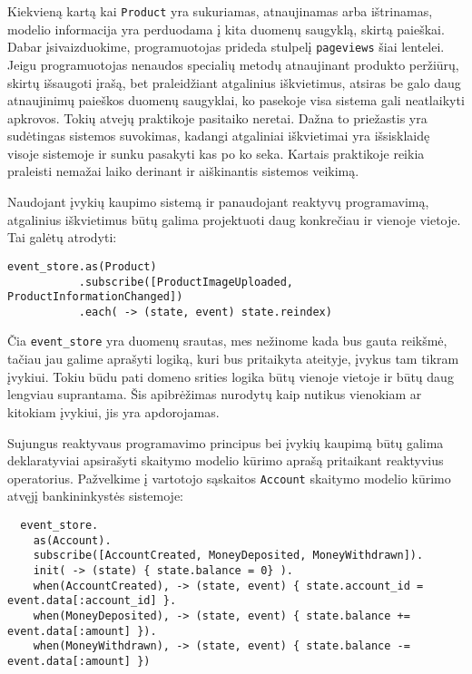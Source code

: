 Kiekvieną kartą kai \lstinline|Product| yra sukuriamas, atnaujinamas arba ištrinamas, modelio informacija yra perduodama į kita duomenų saugyklą, skirtą paieškai. Dabar įsivaizduokime, programuotojas prideda stulpelį \lstinline|pageviews| šiai lentelei. Jeigu programuotojas nenaudos specialių metodų atnaujinant produkto peržiūrų, skirtų išsaugoti įrašą, bet praleidžiant atgalinius iškvietimus, atsiras be galo daug atnaujinimų paieškos duomenų saugyklai, ko pasekoje visa sistema gali neatlaikyti apkrovos. Tokių atvejų praktikoje pasitaiko neretai. Dažna to priežastis yra sudėtingas sistemos suvokimas, kadangi atgaliniai iškvietimai yra išsisklaidę visoje sistemoje ir sunku pasakyti kas po ko seka. Kartais praktikoje reikia praleisti nemažai laiko derinant ir aiškinantis sistemos veikimą.

Naudojant įvykių kaupimo sistemą ir panaudojant reaktyvų programavimą, atgalinius iškvietimus būtų galima projektuoti daug konkrečiau ir vienoje vietoje. Tai galėtų atrodyti:

\begin{lstlisting}[]
event_store.as(Product)
           .subscribe([ProductImageUploaded, ProductInformationChanged])
           .each( -> (state, event) state.reindex)
\end{lstlisting}

Čia \lstinline|event_store| yra duomenų srautas, mes nežinome kada bus gauta reikšmė, tačiau jau galime aprašyti logiką, kuri bus pritaikyta ateityje, įvykus tam tikram įvykiui. Tokiu būdu pati domeno srities logika būtų vienoje vietoje ir būtų daug lengviau suprantama. Šis apibrėžimas nurodytų kaip nutikus vienokiam ar kitokiam įvykiui, jis yra apdorojamas.

Sujungus reaktyvaus programavimo principus bei įvykių kaupimą būtų galima deklaratyviai apsirašyti skaitymo modelio kūrimo aprašą pritaikant reaktyvius operatorius. Pažvelkime į vartotojo sąskaitos \lstinline|Account| skaitymo modelio kūrimo atvęjį bankininkystės sistemoje:

\begin{lstlisting}
  event_store.
    as(Account).
    subscribe([AccountCreated, MoneyDeposited, MoneyWithdrawn]).
    init( -> (state) { state.balance = 0} ).
    when(AccountCreated), -> (state, event) { state.account_id = event.data[:account_id] }.
    when(MoneyDeposited), -> (state, event) { state.balance += event.data[:amount] }).
    when(MoneyWithdrawn), -> (state, event) { state.balance -= event.data[:amount] })
\end{lstlisting}


